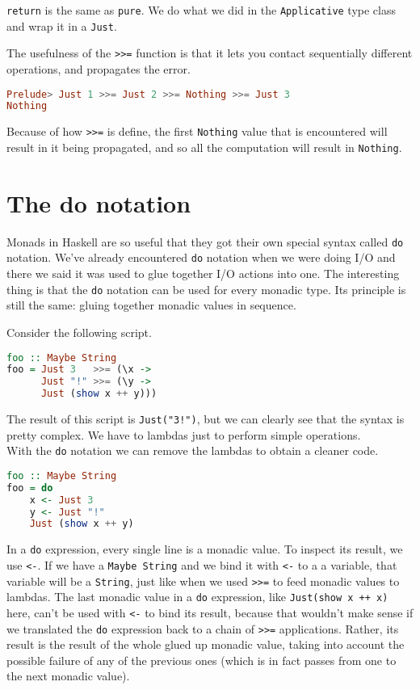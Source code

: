 \texttt{return} is the same as \texttt{pure}. We do what we did in the \texttt{Applicative} type class and wrap it in a \texttt{Just}.
\linebreak \linebreak

The usefulness of the \texttt{>>=} function is that it lets you contact sequentially different operations, and propagates the error.

\begin{lstlisting}[language=haskell]
Prelude> Just 1 >>= Just 2 >>= Nothing >>= Just 3
Nothing
\end{lstlisting}

Because of how \texttt{>>=} is define, the first \texttt{Nothing} value that is encountered will result in it being propagated, and so all the computation will result in \texttt{Nothing}.


\section{The do notation}
Monads in Haskell are so useful that they got their own special syntax called \texttt{do} notation. We've already encountered \texttt{do} notation when we were doing I/O and there we said it was used to glue together I/O actions into one.  The interesting thing is that the \texttt{do} notation can be used for every monadic type. Its principle is still the same: gluing together monadic values in sequence. 
\linebreak \linebreak

Consider the following script.

\begin{lstlisting}[language=haskell]
foo :: Maybe String
foo = Just 3   >>= (\x ->
      Just "!" >>= (\y -> 
      Just (show x ++ y)))
\end{lstlisting}

The result of this script is \texttt{Just("3!")}, but we can clearly see that the syntax is pretty complex. We have to lambdas just to perform simple operations. \\
With the \texttt{do} notation we can remove the lambdas to obtain a cleaner code.

\begin{lstlisting}[language=haskell]
foo :: Maybe String
foo = do
    x <- Just 3
    y <- Just "!"
    Just (show x ++ y)
\end{lstlisting}

In a \texttt{do} expression, every single line is a monadic value. To inspect its result, we use \texttt{<-}. If we have a \texttt{Maybe String} and we bind it with \texttt{<-} to a a variable, that variable will be a \texttt{String}, just like when we used \texttt{>>=} to feed monadic values to lambdas. The last monadic value in a \texttt{do} expression, like \texttt{Just(show x ++ x)} here, can't be used with \texttt{<-} to bind its result, because that wouldn't make sense if we translated the \texttt{do} expression back to a chain of \texttt{>>=} applications. Rather, its result is the result of the whole glued up monadic value, taking into account the possible failure of any of the previous ones (which is in fact passes from one to the next monadic value).
